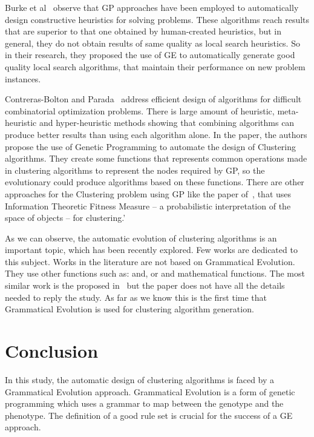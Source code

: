 \documentclass[conference]{IEEEtran}
\begin{document}
	Burke et al~\cite{burke2012grammatical} observe that GP approaches have been employed to automatically design constructive heuristics for solving problems. These algorithms reach results that are superior to that one obtained by human-created heuristics, but in general, they do not obtain results of same quality as local search heuristics. So in their research, they proposed the use of GE to automatically generate good quality local search algorithms, that maintain their performance on new problem instances.
	
	Contreras-Bolton and Parada~\cite{bolton2015optimizing} address efficient design of algorithms for difficult combinatorial optimization problems. There is large amount of heuristic, meta-heuristic and hyper-heuristic methods showing that combining algorithms can produce better results than using each algorithm alone. In the paper, the authors propose the use of Genetic Programming to automate the design of Clustering algorithms. They create some functions that represents common operations made in clustering algorithms to represent the nodes required by GP, so the evolutionary could produce algorithms based on these functions. There are other approaches for the Clustering problem using GP like the paper of~\cite{boric2007genetic}, that uses Information Theoretic Fitness Measure -- a probabilistic interpretation of the space of objects -- for clustering.'
	
	As we can observe, the automatic evolution of clustering algorithms is an important topic, which has been recently explored. Few works are dedicated to this subject. Works in the literature are not based on Grammatical Evolution. They use other functions such as:  and, or and mathematical functions. The most similar work is the proposed in~\cite{bolton2015optimizing} but the paper does not have all the details needed to reply the study.  As far as we know this is the first time that Grammatical Evolution is used for clustering algorithm generation. 
	
	
	\section{Conclusion}
	\label{sec:conclusion}
	
	
	In this study, the automatic design of clustering algorithms is faced by a Grammatical Evolution approach. Grammatical Evolution is a form of genetic programming which uses a grammar to map between the genotype and the phenotype. The definition of a good rule set is crucial for the success of a GE approach. 
	
\end{document}
